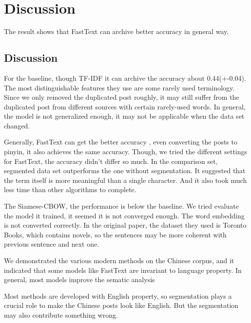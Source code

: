 \chapter{Discussion}

The result shows that FastText can archive better accuracy in general way.

\section{Discussion}


For the baseline, though TF-IDF it can archive the accuracy about 0.44(+-0.04). The most distinguishable features they use are some rarely used terminology. Since we only removed the duplicated post roughly, it may still suffer from the duplicated post from different sources with certain rarely-used words. In general, the model is not generalized enough, it may not be applicable when the data set changed.

Generally, FastText can get the better accuracy , even converting the posts to pinyin, it also achieves the same accuracy. Though, we tried the different settings for FastText, the accuracy didn't differ so much. In the comparison set, segmented data set outperforms the one without segmentation. It suggested that the term itself is more meaningful than a single character. And it also took much less time than other algorithms to complete.

The Siamese-CBOW, the performance is below the baseline. We tried evaluate the model it trained, it seemed it is not converged enough. The word embedding is not converted correctly. In the original paper, the dataset they used is Toronto Books, which contains novels, so the sentences may be more coherent with previous sentence and next one.   


We demonstrated the various modern methods on the Chinese corpus, and it indicated that some models like FastText are invariant to language property. In general, most models improve the sematic analysis 

Most methods are developed with English property, so segmentation plays a crucial role to make the Chinese posts look like English. But the segmentation may also contribute something wrong.